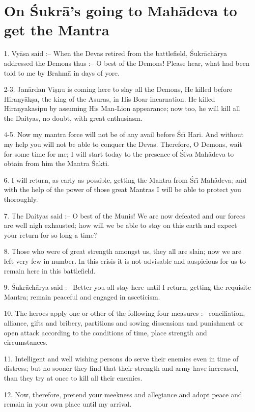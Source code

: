 \chapter{On \'Sukr\=a's going to Mah\=adeva to get the Mantra}

1. Vy\=asa said :-- When the Devas retired from the battlefield, \'Sukr\=ach\=arya addressed the Demons thus :-- O best of the Demons! Please hear, what had been told to me by Brahm\=a in days of yore.

2-3. Jan\=ardan Vi\d{s}\d{n}u is coming here to slay all the Demons, He killed before Hira\d{n}y\=ak\d{s}a, the king of the Asuras, in His Boar incarnation. He killed Hira\d{n}yakasipu by assuming His Man-Lion appearance; now too, he will kill all the Daityas, no doubt, with great enthusiasm.

4-5. Now my mantra force will not be of any avail before \'Sr\={\i} Hari. And without my help you will not be able to conquer the Devas. Therefore, O Demons, wait for some time for me; I will start today to the presence of \'Siva Mah\=adeva to obtain from him the Mantra \'Sakti.

6. I will return, as early as possible, getting the Mantra from \'Sr\={\i} Mah\=adeva; and with the help of the power of those great Mantras I will be able to protect you thoroughly.

7. The Daityas said :-- O best of the Munis! We are now defeated and our forces are well nigh exhausted; how will we be able to stay on this earth and expect your return for so long a time?

8. Those who were of great strength amongst us, they all are slain; now we are left very few in number. In this crisis it is not advisable and auspicious for us to remain here in this battlefield.

9. \'Sukr\=ach\=arya said :-- Better you all stay here until I return, getting the requisite Mantra; remain peaceful and engaged in asceticism.

10. The heroes apply one or other of the following four measures :-- conciliation, alliance, gifts and bribery, partitions and sowing dissensions and punishment or open attack according to the conditions of time, place strength and circumstances.

11. Intelligent and well wishing persons do serve their enemies even in time of distress; but no sooner they find that their strength and army have increased, than they try at once to kill all their enemies.

12. Now, therefore, pretend your meekness and allegiance and adopt peace and remain in your own place until my arrival.

